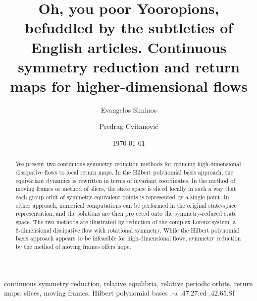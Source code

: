 \documentclass[preprint,number,sort&compress]{elsarticle}
\begin{document}
\begin{frontmatter}

\ifdraft
			\title{
Oh, you poor Yooropions, befuddled by the subtleties of English articles.
			}
\else
			\title{
Continuous symmetry reduction and return maps for higher-dimensional flows
			}
\fi

\author{Evangelos Siminos}
\author{Predrag Cvitanovi\'c}
\address{Center for Nonlinear Science,
School of Physics, Georgia Institute of Technology,
Atlanta, GA 30332-0430}

\date{\today}

        \begin{abstract}
We present two continuous symmetry reduction methods for
reducing high-dimensional dissipative flows to local return
maps. In the Hilbert polynomial basis approach, the equivariant
dynamics is rewritten in terms of invariant coordinates. In the
method of moving frames or method of slices, the state space
is sliced locally in such a way that each group orbit of
symmetry-equivalent points is represented by a single point. In
either approach, numerical computations can be performed in the
original state-space representation, and the solutions are then
projected onto the symmetry-reduced state space. The two methods
are illustrated by reduction of the complex Lorenz system, a
5-dimensional dissipative flow with rotational symmetry. While
the Hilbert polynomial basis approach appears to be infeasible for
high-dimensional flows, symmetry reduction by the method of
moving frames offers hope.
        \end{abstract}

\begin{keyword}
continuous symmetry reduction,
relative equilibria,
relative periodic orbits,
return maps,
slices,
moving frames,
Hilbert polynomial bases
.-a \sep 47.27.ed \sep 42.65.Sf
\end{keyword}
\end{frontmatter}
\end{document}
